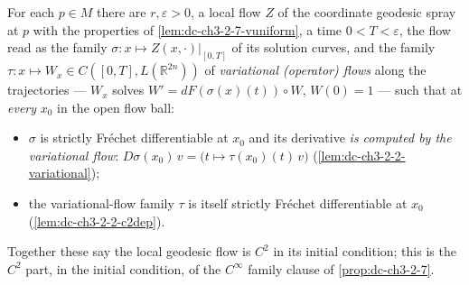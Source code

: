 \begin{lemma}
  \label{lem:dc-ch3-2-7-c2flow}
  \leanok
  For each $p \in M$ there are $r, \varepsilon > 0$, a local flow $Z$ of the
  coordinate geodesic spray at $p$ with the properties of
  \cref{lem:dc-ch3-2-7-vuniform}, a time $0 < T < \varepsilon$, the flow read
  as the family $\sigma : x \mapsto Z(x, \cdot)|_{[0,T]}$ of its solution
  curves, and the family $\tau : x \mapsto W_x \in C([0,T],
  L(\mathbb{R}^{2n}))$ of \emph{variational (operator) flows} along the
  trajectories — $W_x$ solves $W' = dF(\sigma(x)(t)) \circ W$, $W(0) = 1$ —
  such that at \emph{every} $x_0$ in the open flow ball:
  \begin{itemize}
  \item $\sigma$ is strictly Fr\'echet differentiable at $x_0$ and its
    derivative \emph{is computed by the variational flow}:
    $D\sigma(x_0)\,v = \big(t \mapsto \tau(x_0)(t)\,v\big)$
    (\cref{lem:dc-ch3-2-2-variational});
  \item the variational-flow family $\tau$ is itself strictly Fr\'echet
    differentiable at $x_0$ (\cref{lem:dc-ch3-2-2-c2dep}).
  \end{itemize}
  Together these say the local geodesic flow is $C^2$ in its initial
  condition; this is the $C^2$ part, in the initial condition, of the
  $C^\infty$ family clause of \cref{prop:dc-ch3-2-7}.
\end{lemma}
